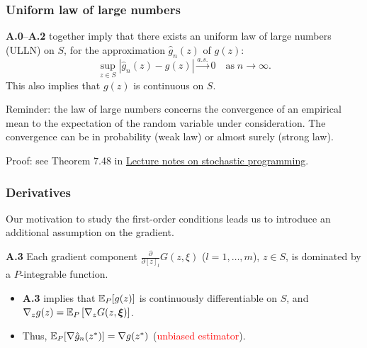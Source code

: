 \documentclass{beamer}
\def\bxi{\boldsymbol\xi}
\begin{document}
\begin{frame}
\frametitle{Uniform law of large numbers}

\textbf{A.0}--\textbf{A.2} together imply that there exists an {\blue uniform law of large numbers (ULLN)} on $S$, for the approximation $\hat{g}_n(z)$ of $g(z)$:%
\[
\sup_{z \in S} \left| \hat{g}_n(z) - g(z) \right|
\overset{a.s.}{\longrightarrow} 0
\quad \mbox{as} \; n \rightarrow \infty.
\]
This also implies that $g(z)$ is continuous on $S$.

\mbox{}

\begin{footnotesize}
Reminder: the law of large numbers concerns the convergence of an empirical mean to the expectation of the random variable under consideration.
The convergence can be in probability (weak law) or almost surely (strong law).
\end{footnotesize}

\mbox{}

Proof: see Theorem 7.48 in \href{https://bpb-us-e1.wpmucdn.com/sites.gatech.edu/dist/4/1470/files/2021/03/SPbook.pdf}{Lecture notes on stochastic programming}.

\end{frame}

\begin{frame}
\frametitle{Derivatives}

Our motivation to study the first-order conditions leads us to introduce an additional assumption on the gradient.

\mbox{}

\noindent
\textbf{A.3}
Each gradient component $\frac{\partial}{\partial [z]_l} G(z, \xi)$ ($l = 1,\ldots,m$), $z \in S$, is dominated by a $P$-integrable function.

\begin{itemize}
	\item 
	\textbf{A.3} implies that ${\mathbb{E}}_P[g(z)]$ is continuously differentiable on $S$, and
	$\nabla_z g(z) = \EE_P\left[ \nabla_z G(z, \bxi) \right]$.
	\item
	Thus, ${\mathbb{E}}_P [\nabla \hat{g}_n(z^*)] = \nabla g( z^*)$ (\textcolor{red}{unbiased estimator}).
\end{itemize}

\end{frame}
\end{document}
